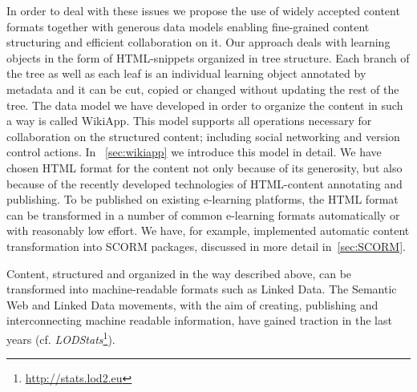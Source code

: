 \documentclass[ngerman,UKenglish,table]{scrbook}
\begin{document}
In order to deal with these issues we propose the use of widely accepted content formats together with generous data models enabling fine-grained content structuring and efficient collaboration on it.
Our approach deals with learning objects in the form of HTML-snippets organized in tree structure.
Each branch of the tree as well as each leaf is an individual learning object annotated by metadata and it can be cut, copied or changed without updating the rest of the tree.
The data model we have developed in order to organize the content in such a way is called WikiApp.
This model supports all operations necessary for collaboration on the structured content; including social networking and version control actions.
In ~\autoref{sec:wikiapp} we introduce this model in detail.
We have chosen HTML format for the content not only because of its generosity, but also because of the recently developed technologies of HTML-content annotating and publishing.
To be published on existing e-learning platforms, the HTML format can be transformed in a number of common e-learning formats automatically or with reasonably low effort.
We have, for example, implemented automatic content transformation into SCORM packages, discussed in more detail in~\autoref{sec:SCORM}.

Content, structured and organized in the way described above, can be transformed into machine-readable formats such as Linked Data.
The Semantic Web and Linked Data movements, with the aim of creating, publishing and interconnecting machine readable information, have gained traction in the last years (cf. \emph{LODStats}\footnote{\url{http://stats.lod2.eu}}).
\end{document}
